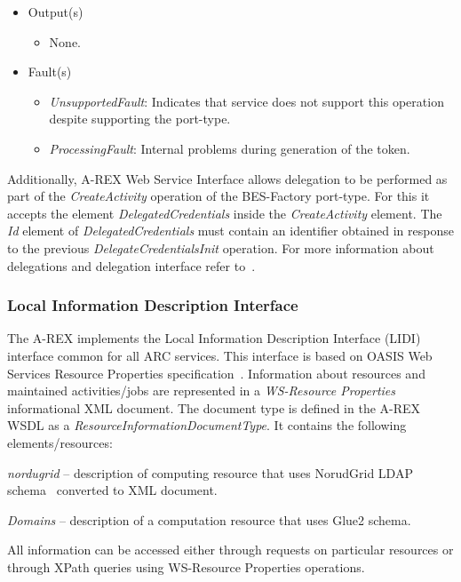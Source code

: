 \documentclass{article}                            %
\begin{document}
\begin{itemize}
\begin{itemize}
\item Output(s)
\begin{itemize}
\item None.
\end{itemize}
\item Fault(s)
\begin{itemize}
\item \emph{UnsupportedFault}: Indicates that service does not support this
operation despite supporting the port-type.
\item \emph{ProcessingFault}: Internal problems during generation of the
token.
\end{itemize}
\end{itemize}
\end{itemize}

Additionally, A-REX Web Service Interface allows delegation to be
performed as part of the \emph{CreateActivity} operation of the BES-Factory
port-type. For this it accepts the element \emph{DelegatedCredentials}
inside the \emph{CreateActivity} element. The \emph{Id} element of
\emph{DelegatedCredentials} must contain an identifier obtained in
response to the previous \emph{DelegateCredentialsInit} operation.
For more information about delegations and delegation interface refer
to~\cite{wsrf-rp}.

\subsubsection{Local Information Description Interface}

The A-REX implements the Local Information Description Interface (LIDI)
interface common for all ARC services. This interface is based on
OASIS Web Services Resource Properties specification~\cite{wsrf-rp}.
Information about resources and maintained activities/jobs are represented
in a \emph{WS-Resource Properties} informational XML document. The
document type is defined in the A-REX WSDL as a \emph{ResourceInformationDocumentType}.
It contains the following elements/resources:

\begin{list}{--}{\setlength{\labelwidth}{0.5cm}\setlength{\rightmargin}{\leftmargin}}
\item [{\emph{nordugrid}}] -- description of computing resource that uses
NorudGrid LDAP schema~\cite{is} converted to XML document.
\item [{\emph{Domains}}] -- description of a computation resource
that uses Glue2 schema.
\end{list}
All information can be accessed either through requests on particular
resources or through XPath queries using WS-Resource Properties operations.
\end{document}
